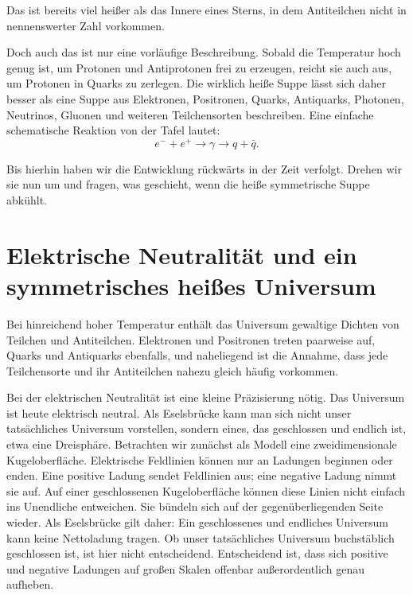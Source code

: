 Das ist bereits viel heißer als das Innere eines Sterns, in dem Antiteilchen nicht in nennenswerter Zahl vorkommen.

Doch auch das ist nur eine vorläufige Beschreibung. Sobald die Temperatur hoch genug ist, um Protonen und Antiprotonen frei zu erzeugen, reicht sie auch aus, um Protonen in Quarks zu zerlegen. Die wirklich heiße Suppe lässt sich daher besser als eine Suppe aus Elektronen, Positronen, Quarks, Antiquarks, Photonen, Neutrinos, Gluonen und weiteren Teilchensorten beschreiben. Eine einfache schematische Reaktion von der Tafel lautet:
\[
e^- + e^+ \to \gamma \to q + \bar q.
\]

\begin{classroomqa}
\end{classroomqa}

Bis hierhin haben wir die Entwicklung rückwärts in der Zeit verfolgt. Drehen wir sie nun um und fragen, was geschieht, wenn die heiße symmetrische Suppe abkühlt.

\section{Elektrische Neutralität und ein symmetrisches heißes Universum}

Bei hinreichend hoher Temperatur enthält das Universum gewaltige Dichten von Teilchen und Antiteilchen. Elektronen und Positronen treten paarweise auf, Quarks und Antiquarks ebenfalls, und naheliegend ist die Annahme, dass jede Teilchensorte und ihr Antiteilchen nahezu gleich häufig vorkommen.

Bei der elektrischen Neutralität ist eine kleine Präzisierung nötig. Das Universum ist heute elektrisch neutral. Als Eselsbrücke kann man sich nicht unser tatsächliches Universum vorstellen, sondern eines, das geschlossen und endlich ist, etwa eine Dreisphäre. Betrachten wir zunächst als Modell eine zweidimensionale Kugeloberfläche. Elektrische Feldlinien können nur an Ladungen beginnen oder enden. Eine positive Ladung sendet Feldlinien aus; eine negative Ladung nimmt sie auf. Auf einer geschlossenen Kugeloberfläche können diese Linien nicht einfach ins Unendliche entweichen. Sie bündeln sich auf der gegenüberliegenden Seite wieder. Als Eselsbrücke gilt daher: Ein geschlossenes und endliches Universum kann keine Nettoladung tragen. Ob unser tatsächliches Universum buchstäblich geschlossen ist, ist hier nicht entscheidend. Entscheidend ist, dass sich positive und negative Ladungen auf großen Skalen offenbar außerordentlich genau aufheben.

